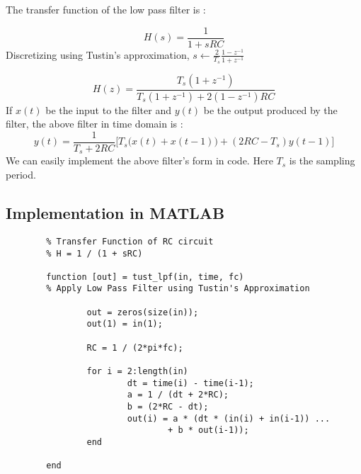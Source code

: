 \documentclass[report.tex]{subfiles}
\begin{document}
        The transfer function of the low pass filter is :
        
        $$
        H(s) = \frac{1}{1 + sRC}
        $$
        Discretizing using Tustin's approximation,
        $ s \leftarrow \frac{2}{T_s} \frac{1 - z^{-1}}{1 + z^{-1}} $

        $$
        H(z) = \frac{T_s (1 + z^{-1})}{T_s (1 + z^{-1}) + 2 (1 - z^{-1}) RC}
        $$
        If $x(t)$ be the input to the filter and $y(t)$ be the output produced
        by the filter, the above filter in time domain is :
        $$
        y(t) = \frac{1}{T_s + 2RC} \Bigg [T_s \Bigg (x(t) + x(t-1)\Bigg) +
        (2RC - T_s) y(t-1) \Bigg ]
        $$
        We can easily implement the above filter's form in code. Here $T_s$ is
        the sampling period.

        \subsection{Implementation in MATLAB}
        \begin{lstlisting}
        % Transfer Function of RC circuit
        % H = 1 / (1 + sRC)

        function [out] = tust_lpf(in, time, fc)
        % Apply Low Pass Filter using Tustin's Approximation

                out = zeros(size(in));
                out(1) = in(1);
                
                RC = 1 / (2*pi*fc);
                
                for i = 2:length(in)
                        dt = time(i) - time(i-1);
                        a = 1 / (dt + 2*RC);
                        b = (2*RC - dt);
                        out(i) = a * (dt * (in(i) + in(i-1)) ...
                                + b * out(i-1));
                end

        end
        \end{lstlisting}
        
\end{document}
